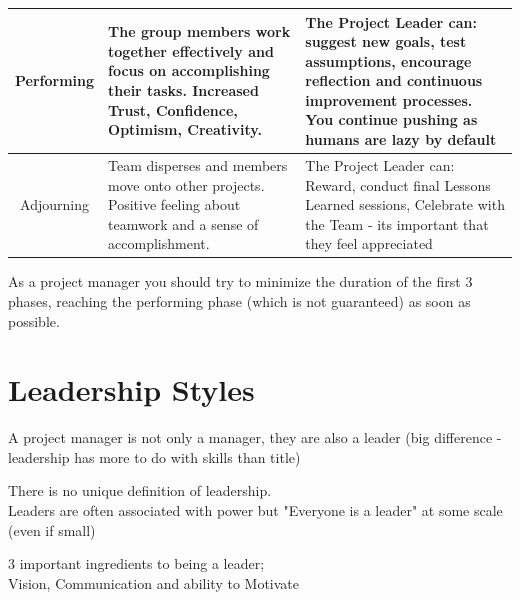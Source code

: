 \documentclass[]{project_plan}
\begin{document}
\begin{tabular}{|c|p{70mm}|p{60mm}|}
  \hline
  Performing & The group members work together effectively and focus on  accomplishing their tasks. Increased Trust,  Confidence, Optimism, Creativity.                                                                                                                                                                                                                                                                                                                                             & The Project Leader can: suggest new goals, test assumptions,  encourage reflection and continuous improvement processes. You continue pushing as humans are lazy by default                                                                                            \\
  \hline
  Adjourning & Team disperses and members move onto other projects. Positive  feeling about teamwork and a sense of  accomplishment.                                                                                                                                                                                                                                                                                                                                                                & The Project Leader can: Reward, conduct final Lessons Learned  sessions, Celebrate with the Team - its important that they feel appreciated                                                                                                                            \\
  \hline
\end{tabular}

As a project manager you should try to minimize the duration of the first
3 phases, reaching the performing phase (which is not guaranteed) as soon as possible.

\newpage

\section{Leadership Styles}

A project manager is not only a manager, they are also a leader (big difference - leadership has more to do with skills than title)

There is no unique definition of leadership.\\
Leaders are often associated with power but "Everyone is a leader" at some scale (even if small)

3 important ingredients to being a leader;\\
Vision, Communication and ability to Motivate
\end{document}
